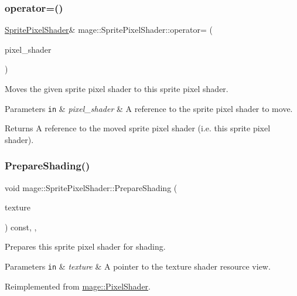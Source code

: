 \subsubsection{\texorpdfstring{operator=()}{operator=()}\hspace{0.1cm}{\footnotesize\ttfamily [2/2]}}
{\footnotesize\ttfamily \hyperlink{classmage_1_1_sprite_pixel_shader}{Sprite\+Pixel\+Shader}\& mage\+::\+Sprite\+Pixel\+Shader\+::operator= (\begin{DoxyParamCaption}\item[{\hyperlink{classmage_1_1_sprite_pixel_shader}{Sprite\+Pixel\+Shader} \&\&}]{pixel\+\_\+shader }\end{DoxyParamCaption})\hspace{0.3cm}{\ttfamily [delete]}}

Moves the given sprite pixel shader to this sprite pixel shader.


\begin{DoxyParams}[1]{Parameters}
\mbox{\tt in}  & {\em pixel\+\_\+shader} & A reference to the sprite pixel shader to move. \\
\hline
\end{DoxyParams}
\begin{DoxyReturn}{Returns}
A reference to the moved sprite pixel shader (i.\+e. this sprite pixel shader). 
\end{DoxyReturn}
\hypertarget{classmage_1_1_sprite_pixel_shader_a8c0c4daf36c74822a772b1a38e8d876a}{}\label{classmage_1_1_sprite_pixel_shader_a8c0c4daf36c74822a772b1a38e8d876a} 
\subsubsection{\texorpdfstring{Prepare\+Shading()}{PrepareShading()}}
{\footnotesize\ttfamily void mage\+::\+Sprite\+Pixel\+Shader\+::\+Prepare\+Shading (\begin{DoxyParamCaption}\item[{I\+D3\+D11\+Shader\+Resource\+View $\ast$}]{texture }\end{DoxyParamCaption}) const\hspace{0.3cm}{\ttfamily [final]}, {\ttfamily [override]}, {\ttfamily [virtual]}}

Prepares this sprite pixel shader for shading.


\begin{DoxyParams}[1]{Parameters}
\mbox{\tt in}  & {\em texture} & A pointer to the texture shader resource view. \\
\hline
\end{DoxyParams}


Reimplemented from \hyperlink{classmage_1_1_pixel_shader_ab677013145ca252c57e5a001134c01ff}{mage\+::\+Pixel\+Shader}.

